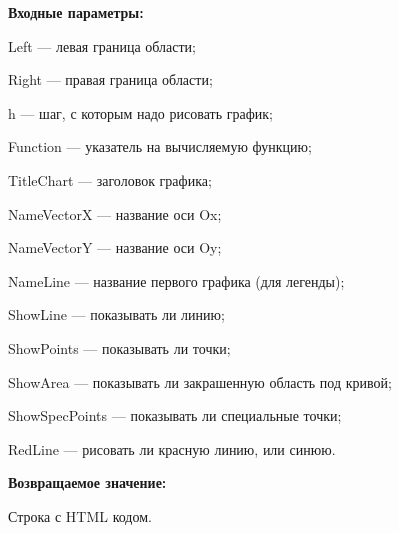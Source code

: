 \textbf{Входные параметры:}
 
    Left --- левая граница области;
 
    Right --- правая граница области;
 
    h --- шаг, с которым надо рисовать график;
 
    Function --- указатель на вычисляемую функцию;
 
    TitleChart --- заголовок графика;
 
    NameVectorX --- название оси Ox;
 
    NameVectorY --- название оси Oy;
 
    NameLine --- название первого графика (для легенды);
 
    ShowLine --- показывать ли линию;
 
    ShowPoints --- показывать ли точки;
 
    ShowArea --- показывать ли закрашенную область под кривой;
 
    ShowSpecPoints --- показывать ли специальные точки;
 
    RedLine --- рисовать ли красную линию, или синюю.

\textbf{Возвращаемое значение:}

Строка с HTML кодом.